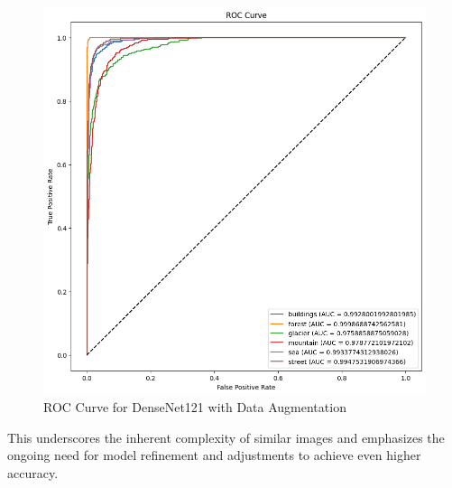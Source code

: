 \documentclass[conference]{IEEEtran}
\begin{document}
\begin{figure}[H]
    \centering
    \includegraphics[width=1\linewidth]{images//DenseNet/ROC_DenseNet_Data_Augmented.png}
    \caption{ROC Curve for DenseNet121 with Data Augmentation}
    \label{fig:ROC_DenseNet_DA}
\end{figure}

This underscores the inherent complexity of similar images and emphasizes the ongoing need for model refinement and adjustments to achieve even higher accuracy.
\end{document}
